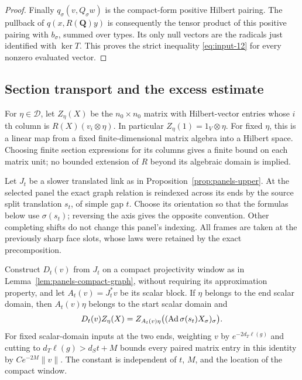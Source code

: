 \begin{proof}
Finally $q_\sigma(v,Q_\sigma w)$ is the compact-form positive Hilbert
pairing.  The pullback of $q(x,R(\mathbf Q)y)$ is consequently the
tensor product of this positive pairing with $b_\sigma$, summed over
types.  Its only null vectors are the radicals just identified with
$\ker T$.  This proves the strict inequality
\eqref{eq:input-12} for every nonzero evaluated vector.
\end{proof}

\subsection{Section transport and the excess estimate}

For $\eta\in\mathscr D$, let $Z_\eta(X)$ be the $n_0\times n_0$
matrix with Hilbert-vector entries whose $i$th column is
$R(X)(v_i\otimes\eta)$.  In particular $Z_\eta(1)=1_V\otimes\eta$.
For fixed $\eta$, this is a linear map from a fixed finite-dimensional
matrix algebra into a Hilbert space.  Choosing finite section
expressions for its columns gives a finite bound on each matrix unit;
no bounded extension of $R$ beyond its algebraic domain is implied.

Let $J_t$ be a slower translated link as in
Proposition~\ref{prop:panels-upper}.  At the selected panel the exact
graph relation is reindexed across its ends by the source split
translation $s_t$, of simple gap $t$.  Choose its orientation so that
the formulas below use $\sigma(s_t)$; reversing the axis gives the
opposite convention.  Other completing shifts do not change this
panel's indexing.  All frames are taken at the previously sharp face
slots, whose laws were retained by the exact precomposition.

\begin{lemma}\label{lem:panels-action-exchange}
Construct $D_t(v)$ from $J_t$ on a compact projectivity window as in
Lemma~\ref{lem:panels-compact-graph}, without requiring its approximation
property, and let $A_t(v)=J_t^*v$ be its scalar block.  If $\eta$ belongs
to the end scalar domain, then $A_t(v)\eta$ belongs to the start scalar
domain and
\begin{equation}\label{eq:input-13}
 D_t(v)Z_\eta(X)=
 Z_{A_t(v)\eta}
 \bigl((\operatorname{Ad}\sigma(s_t)X_\sigma)_\sigma\bigr).
\end{equation}
For fixed scalar-domain inputs at the two ends, weighting $v$ by
$e^{-2d_T\ell(g)}$ and cutting to $d_T\ell(g)>d_St+M$ bounds every
paired matrix entry in this identity by
$C e^{-2M}\|v\|$.  The constant is independent of $t$, $M$, and the
location of the compact window.
\end{lemma}

